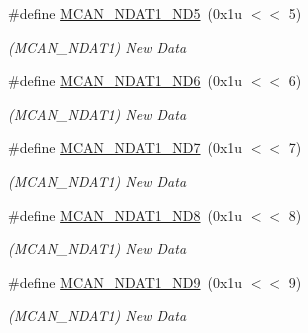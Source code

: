 \begin{DoxyCompactItemize}
\#define \mbox{\hyperlink{group__SAME70__MCAN_ga73d7da4f83ad1a65335fc27462d41521}{M\+C\+A\+N\+\_\+\+N\+D\+A\+T1\+\_\+\+N\+D5}}~(0x1u $<$$<$ 5)
\begin{DoxyCompactList}\small\item\em (M\+C\+A\+N\+\_\+\+N\+D\+A\+T1) New Data \end{DoxyCompactList}\item 
\mbox{\label{group__SAME70__MCAN_ga1e868644b41a62aa4c594c99e270c96b}} 
\#define \mbox{\hyperlink{group__SAME70__MCAN_ga1e868644b41a62aa4c594c99e270c96b}{M\+C\+A\+N\+\_\+\+N\+D\+A\+T1\+\_\+\+N\+D6}}~(0x1u $<$$<$ 6)
\begin{DoxyCompactList}\small\item\em (M\+C\+A\+N\+\_\+\+N\+D\+A\+T1) New Data \end{DoxyCompactList}\item 
\mbox{\label{group__SAME70__MCAN_ga9598a03e061cd7391ea7b89431ddc38f}} 
\#define \mbox{\hyperlink{group__SAME70__MCAN_ga9598a03e061cd7391ea7b89431ddc38f}{M\+C\+A\+N\+\_\+\+N\+D\+A\+T1\+\_\+\+N\+D7}}~(0x1u $<$$<$ 7)
\begin{DoxyCompactList}\small\item\em (M\+C\+A\+N\+\_\+\+N\+D\+A\+T1) New Data \end{DoxyCompactList}\item 
\mbox{\label{group__SAME70__MCAN_ga96f3e8449fa0c338e6e7942ea6efe9a8}} 
\#define \mbox{\hyperlink{group__SAME70__MCAN_ga96f3e8449fa0c338e6e7942ea6efe9a8}{M\+C\+A\+N\+\_\+\+N\+D\+A\+T1\+\_\+\+N\+D8}}~(0x1u $<$$<$ 8)
\begin{DoxyCompactList}\small\item\em (M\+C\+A\+N\+\_\+\+N\+D\+A\+T1) New Data \end{DoxyCompactList}\item 
\mbox{\label{group__SAME70__MCAN_gae51957994a5d787bc422ea1079674b01}} 
\#define \mbox{\hyperlink{group__SAME70__MCAN_gae51957994a5d787bc422ea1079674b01}{M\+C\+A\+N\+\_\+\+N\+D\+A\+T1\+\_\+\+N\+D9}}~(0x1u $<$$<$ 9)
\begin{DoxyCompactList}\small\item\em (M\+C\+A\+N\+\_\+\+N\+D\+A\+T1) New Data \end{DoxyCompactList}\item 
$$
\end{DoxyCompactItemize}
